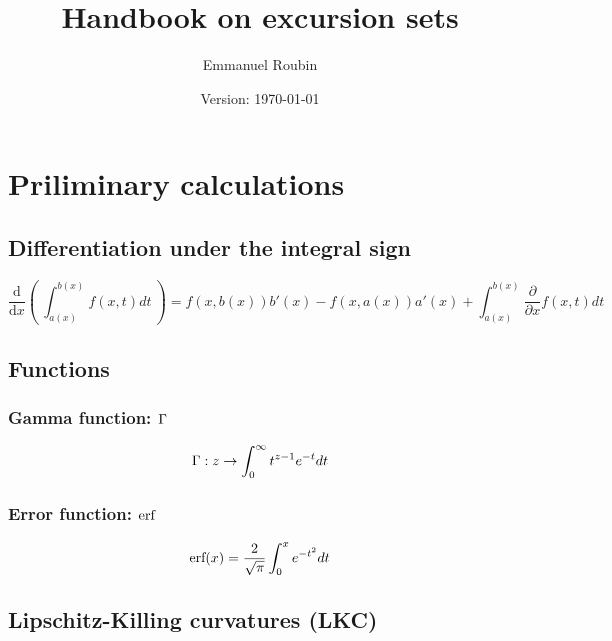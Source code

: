 \documentclass[a4paper,12pt]{article}
\title{Handbook on excursion sets}
\author{Emmanuel Roubin}
\date{Version: \today}
\begin{document}
\maketitle
\tableofcontents
\newpage
\section{Priliminary calculations}
\subsection{Differentiation under the integral sign}
\begin{equation}
  \frac{\text{d}}{\text{d}x}\left(\ \int_{a(x)}^{b(x)} f(x,t) dt \ \right) = f(x,b(x))b'(x)-f(x,a(x))a'(x)+\int_{a(x)}^{b(x)}\frac{\partial}{\partial x}f(x,t)dt
\end{equation}
\subsection{Functions}
\subsubsection{Gamma function: $\Gamma$}
\begin{equation}\Gamma: z \rightarrow \int_0^\infty t^{z-1}e^{-t} dt\end{equation}
\subsubsection{Error function: $\text{erf}$}
\begin{equation}\text{erf}(x)=\frac{2}{\sqrt\pi}\int_0^xe^{-t^2}dt\end{equation}
\subsection{Lipschitz-Killing curvatures (LKC)}
\end{document}
